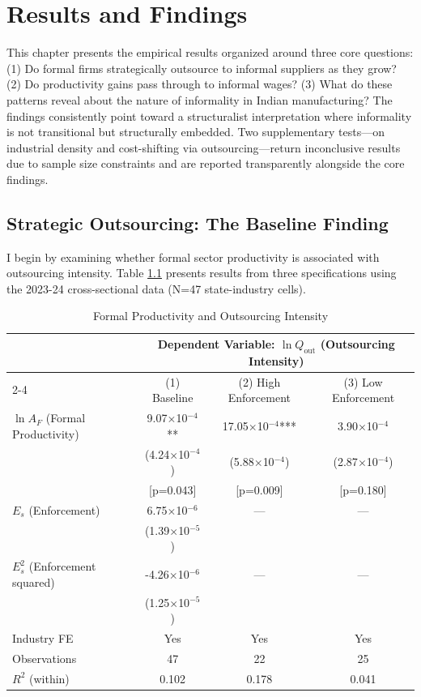 \chapter{Results and Findings}
\label{ch:results}

This chapter presents the empirical results organized around three core questions: (1) Do formal firms strategically outsource to informal suppliers as they grow? (2) Do productivity gains pass through to informal wages? (3) What do these patterns reveal about the nature of informality in Indian manufacturing? The findings consistently point toward a structuralist interpretation where informality is not transitional but structurally embedded. Two supplementary tests—on industrial density and cost-shifting via outsourcing—return inconclusive results due to sample size constraints and are reported transparently alongside the core findings.

\section{Strategic Outsourcing: The Baseline Finding}
\label{sec:outsourcing_results}

I begin by examining whether formal sector productivity is associated with outsourcing intensity. Table \ref{tab:outsourcing_results} presents results from three specifications using the 2023-24 cross-sectional data (N=47 state-industry cells).

\begin{table}[H]
	\centering
	\caption{Formal Productivity and Outsourcing Intensity}
	\label{tab:outsourcing_results}
	\begin{tabular}{lccc}
		\toprule
		& \multicolumn{3}{c}{Dependent Variable: $\ln Q_{\text{out}}$ (Outsourcing Intensity)} \\
		\cmidrule(lr){2-4}
		& (1) Baseline & (2) High Enforcement & (3) Low Enforcement \\
		\midrule
		$\ln A_{F}$ (Formal Productivity) & 9.07$\times$10$^{-4}$** & 17.05$\times$10$^{-4}$*** & 3.90$\times$10$^{-4}$ \\
		& (4.24$\times$10$^{-4}$) & (5.88$\times$10$^{-4}$) & (2.87$\times$10$^{-4}$) \\
		& [p=0.043] & [p=0.009] & [p=0.180] \\
		\midrule
		$E_s$ (Enforcement) & 6.75$\times$10$^{-6}$ & — & — \\
		& (1.39$\times$10$^{-5}$) & & \\
		$E_s^2$ (Enforcement squared) & -4.26$\times$10$^{-6}$ & — & — \\
		& (1.25$\times$10$^{-5}$) & & \\
		\midrule
		Industry FE & Yes & Yes & Yes \\
		Observations & 47 & 22 & 25 \\
		$R^2$ (within) & 0.102 & 0.178 & 0.041 \\
		\bottomrule
	\end{tabular}
\end{table}

